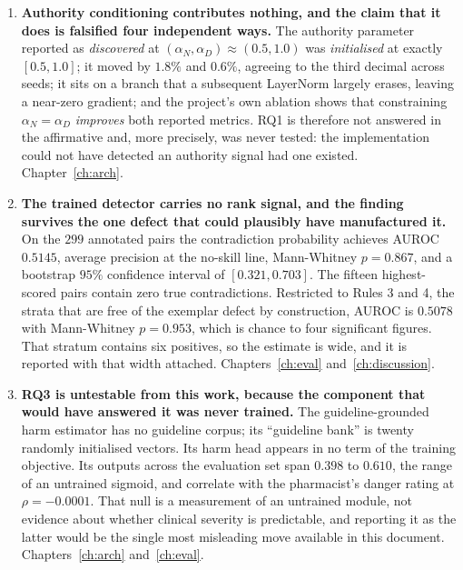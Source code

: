 \begin{enumerate}
\item \textbf{Authority conditioning contributes nothing, and the claim that it
      does is falsified four independent ways.} The authority parameter reported
      as \emph{discovered} at $(\alpha_N, \alpha_D) \approx (0.5, 1.0)$ was
      \emph{initialised} at exactly $[0.5, 1.0]$; it moved by $1.8\%$ and
      $0.6\%$, agreeing to the third decimal across seeds; it sits on a branch
      that a subsequent LayerNorm largely erases, leaving a near-zero gradient;
      and the project's own ablation shows that constraining
      $\alpha_N = \alpha_D$ \emph{improves} both reported metrics. RQ1 is
      therefore not answered in the affirmative and, more precisely, was never
      tested: the implementation could not have detected an authority signal had
      one existed. Chapter~\ref{ch:arch}.

\item \textbf{The trained detector carries no rank signal, and the finding
      survives the one defect that could plausibly have manufactured it.} On the
      $299$ annotated pairs the contradiction probability achieves AUROC
      $0.5145$, average precision at the no-skill line, Mann-Whitney $p = 0.867$,
      and a bootstrap $95\%$ confidence interval of $[0.321, 0.703]$. The
      fifteen highest-scored pairs contain zero true contradictions. Restricted
      to Rules 3 and 4, the strata that are free of the exemplar defect by
      construction, AUROC is $0.5078$ with Mann-Whitney $p = 0.953$, which is
      chance to four significant figures. That stratum contains six positives,
      so the estimate is wide, and it is reported with that width attached.
      Chapters~\ref{ch:eval} and~\ref{ch:discussion}.

\item \textbf{RQ3 is untestable from this work, because the component that would
      have answered it was never trained.} The guideline-grounded harm estimator
      has no guideline corpus; its ``guideline bank'' is twenty randomly
      initialised vectors. Its harm head appears in no term of the training
      objective. Its outputs across the evaluation set span $0.398$ to $0.610$,
      the range of an untrained sigmoid, and correlate with the pharmacist's
      danger rating at $\rho = -0.0001$. That null is a measurement of an
      untrained module, not evidence about whether clinical severity is
      predictable, and reporting it as the latter would be the single most
      misleading move available in this document. Chapters~\ref{ch:arch}
      and~\ref{ch:eval}.


\end{enumerate}
